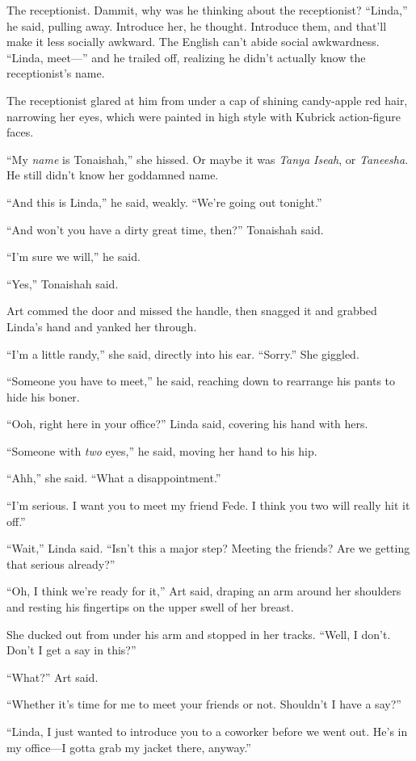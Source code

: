 The receptionist. Dammit, why was he thinking about the
receptionist? “Linda,” he said, pulling away. Introduce her, he
thought. Introduce them, and that’ll make it less socially awkward.
The English can’t abide social awkwardness. “Linda, meet—” and he
trailed off, realizing he didn’t actually know the receptionist’s
name.

The receptionist glared at him from under a cap of shining
candy-apple red hair, narrowing her eyes, which were painted in
high style with Kubrick action-figure faces.

“My \emph{name} is Tonaishah,” she hissed. Or maybe it was
\emph{Tanya Iseah}, or \emph{Taneesha}. He still didn’t know her
goddamned name.

“And this is Linda,” he said, weakly. “We’re going out tonight.”

“And won’t you have a dirty great time, then?” Tonaishah said.

“I’m sure we will,” he said.

“Yes,” Tonaishah said.

Art commed the door and missed the handle, then snagged it and
grabbed Linda’s hand and yanked her through.

“I’m a little randy,” she said, directly into his ear. “Sorry.” She
giggled.

“Someone you have to meet,” he said, reaching down to rearrange his
pants to hide his boner.

“Ooh, right here in your office?” Linda said, covering his hand
with hers.

“Someone with \emph{two} eyes,” he said, moving her hand to his
hip.

“Ahh,” she said. “What a disappointment.”

“I’m serious. I want you to meet my friend Fede. I think you two
will really hit it off.”

“Wait,” Linda said. “Isn’t this a major step? Meeting the friends?
Are we getting that serious already?”

“Oh, I think we’re ready for it,” Art said, draping an arm around
her shoulders and resting his fingertips on the upper swell of her
breast.

She ducked out from under his arm and stopped in her tracks. “Well,
I don’t. Don’t I get a say in this?”

“What?” Art said.

“Whether it’s time for me to meet your friends or not. Shouldn’t I
have a say?”

“Linda, I just wanted to introduce you to a coworker before we went
out. He’s in my office—I gotta grab my jacket there, anyway.”

